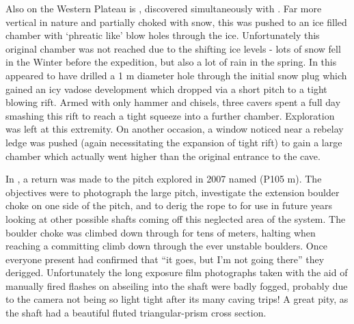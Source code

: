 Also on the Western Plateau is , discovered
simultaneously with . Far more vertical in nature and
partially choked with snow, this was pushed to an ice filled chamber
with `phreatic like' blow holes through the ice. Unfortunately this
original chamber was not reached due to the shifting ice levels - lots
of snow fell in the Winter before the expedition, but also a lot of rain
in the spring. In  this appeared to have drilled a 1 m
diameter hole through the initial snow plug which gained an icy vadose
development which dropped via a short pitch to a tight blowing rift.
Armed with only hammer and chisels, three cavers spent a full day
smashing this rift to reach a tight squeeze into a further chamber.
Exploration was left at this extremity. On another occasion, a window
noticed near a rebelay ledge was pushed (again necessitating the
expansion of tight rift) to gain a large chamber which actually went
higher than the original entrance to the cave.

In , a return was made to the pitch explored in 2007 named
 (P105 m). The objectives were to photograph the large
pitch, investigate the extension boulder choke on one side of the pitch,
and to derig the rope to  for use in future years looking at
other possible shafts coming off this neglected area of the system. The
boulder choke was climbed down through for tens of meters, halting when
reaching a committing climb down through the ever unstable boulders.
Once everyone present had confirmed that ``it goes, but I'm not going
there'' they derigged. Unfortunately the long exposure film photographs
taken with the aid of manually fired flashes on abseiling into the shaft
were badly fogged, probably due to the camera not being so light tight
after its many caving trips! A great pity, as the shaft had a beautiful
fluted triangular-prism cross section.


